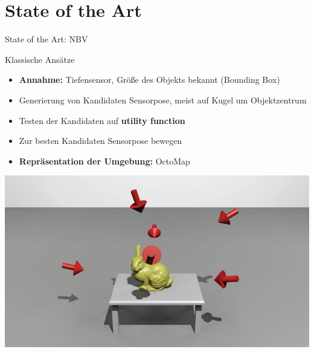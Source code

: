 \documentclass[aspectratio=169]{beamer}
\begin{document}
\section{State of the Art}
\begin{frame}{State of the Art: NBV}
	\begin{minipage}{0.49\textwidth}
		\begin{block}{Klassische Ansätze}
			\begin{itemize}
				\item \textbf{Annahme:} Tiefensensor, Größe des Objekts bekannt (Bounding Box)
				\item Generierung von Kandidaten Sensorpose, meist auf Kugel um Objektzentrum
				\item Testen der Kandidaten auf \textbf{utility function}
				\item Zur besten Kandidaten Sensorpose bewegen
				\item \textbf{Repräsentation der Umgebung:} OctoMap
			\end{itemize}
			\cite{zeng_view_2020}
		\end{block}
	\end{minipage}
	\hfill
	\begin{minipage}{0.49\textwidth}
		\centering
		\includegraphics[width=1.0\textwidth]{Graphics/nbv_trad.jpg}
		\cite{vasquez-gomez_volumetric_2014}

	\end{minipage}
\end{frame}
\end{document}

